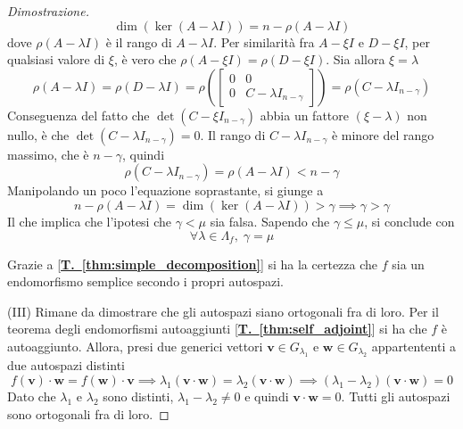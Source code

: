 \documentclass{article}
\begin{document}
\begin{proof}[Dimostrazione]
        \[
            \dim(\ker(A - \lambda I)) = n - \rho(A - \lambda I)
        \]
        dove $\rho(A - \lambda I)$ è il rango di $A - \lambda I$. Per similarità fra $A - \xi I$ e $D - \xi I$, per qualsiasi valore di $\xi$, è vero che $\rho(A - \xi I) = \rho(D - \xi I)$. Sia allora $\xi = \lambda$
        \[
            \rho(A - \lambda I) = \rho(D - \lambda I) = \rho\left(\begin{bmatrix}
                0 & 0 \\
                0 & C - \lambda I_{n - \gamma}
            \end{bmatrix}\right) = \rho(C - \lambda I_{n - \gamma})
        \]
        Conseguenza del fatto che $\det(C - \xi I_{n - \gamma})$ abbia un fattore $(\xi - \lambda)$ non nullo, è che $\det(C - \lambda I_{n - \gamma}) = 0$. Il rango di $C - \lambda I_{n-\gamma}$ è minore del rango massimo, che è $n - \gamma$, quindi
        \[
            \rho(C - \lambda I_{n - \gamma}) = \rho(A - \lambda I) < n - \gamma
        \]
        Manipolando un poco l'equazione soprastante, si giunge a
        \[
            n - \rho(A - \lambda I) = \dim(\ker(A - \lambda I)) > \gamma \implies \gamma > \gamma
        \]
        Il che implica che l'ipotesi che $\gamma < \mu$ sia falsa. Sapendo che $\gamma \leq \mu$, si conclude con 
        \[
            \forall \lambda \in \Lambda_{f}, \; \gamma = \mu  
        \]

        Grazie a [{\bfseries \hyperref[thm:self_adjoint]{T.~\ref{thm:simple_decomposition}}}] si ha la certezza che $f$ sia un endomorfismo semplice secondo i propri autospazi.
        
        \vspace{10pt}
        (III) Rimane da dimostrare che gli autospazi siano ortogonali fra di loro. Per il teorema degli endomorfismi autoaggiunti [{\bfseries \hyperref[thm:self_adjoint]{T.~\ref{thm:self_adjoint}}}] si ha che $f$ è autoaggiunto. Allora, presi due generici vettori $\mathbf{v} \in G_{\lambda_1}$ e $\mathbf{w} \in G_{\lambda_2}$ appartententi a due autospazi distinti
        \[
            f(\mathbf{v}) \cdot \mathbf{w} = f(\mathbf{w}) \cdot \mathbf{v} \implies \lambda_1 (\mathbf{v} \cdot \mathbf{w}) = \lambda_2 (\mathbf{v} \cdot \mathbf{w}) \implies (\lambda_1 - \lambda_2)(\mathbf{v} \cdot \mathbf{w}) = 0
        \]
        Dato che $\lambda_1$ e $\lambda_2$ sono distinti, $\lambda_1 - \lambda_2 \neq 0$ e quindi $\mathbf{v} \cdot \mathbf{w} = 0$. Tutti gli autospazi sono ortogonali fra di loro.
       
    \end{proof}
\end{document}
